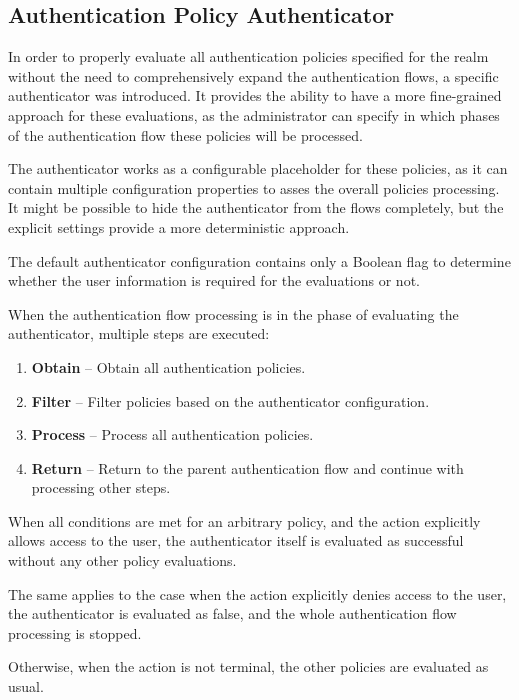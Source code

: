 \newpage

\subsection{Authentication Policy Authenticator}
In order to properly evaluate all authentication policies specified for the realm without the need to comprehensively expand the authentication flows, a specific authenticator was introduced.
It provides the ability to have a more fine-grained approach for these evaluations, as the administrator can specify in which phases of the authentication flow these policies will be processed.

The authenticator works as a configurable placeholder for these policies, as it can contain multiple configuration properties to asses the overall policies processing.
It might be possible to hide the authenticator from the flows completely, but the explicit settings provide a more deterministic approach.

The default authenticator configuration contains only a Boolean flag to determine whether the user information is required for the evaluations or not.

When the authentication flow processing is in the phase of evaluating the authenticator, multiple steps are executed:

\begin{enumerate}
    \item \textbf{Obtain} -- Obtain all authentication policies.
    \item \textbf{Filter} -- Filter policies based on the authenticator configuration.
    \item \textbf{Process} -- Process all authentication policies.
    \item \textbf{Return} -- Return to the parent authentication flow and continue with processing other steps.
\end{enumerate}

When all conditions are met for an arbitrary policy, and the action explicitly allows access to the user, the authenticator itself is evaluated as successful without any other policy evaluations.

The same applies to the case when the action explicitly denies access to the user, the authenticator is evaluated as false, and the whole authentication flow processing is stopped.

Otherwise, when the action is not terminal, the other policies are evaluated as usual.

